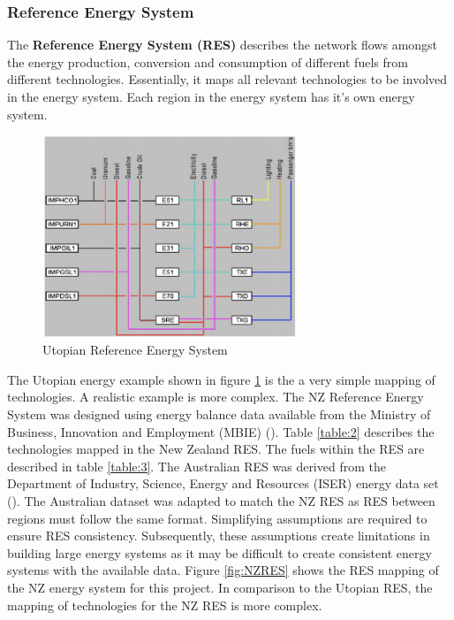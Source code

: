 \documentclass[12pt]{article}
\begin{document}
\subsubsection{Reference Energy System}
The \textbf{Reference Energy System (RES)} describes the network flows amongst the energy production, conversion and consumption of different fuels from different technologies.
Essentially, it maps all relevant technologies to be involved in the energy system. Each region in the energy system has it's own energy system.

\begin{figure}
	\begin{center}
		\includegraphics[width=0.68\textwidth]{URES.png}
	\end{center}
	\caption{Utopian Reference Energy System}
	\label{fig:URES}
\end{figure}
The Utopian energy example shown in figure \ref{fig:URES} is the a very simple mapping of technologies.
A realistic example is more complex. The NZ Reference Energy System was designed using energy balance data available from
the Ministry of Business, Innovation and Employment (MBIE) (\cite{MBIE_ESEM}). 
Table \ref{table:2} describes the technologies mapped in the New Zealand RES.
The fuels within the RES are  described in table \ref{table:3}.
The Australian RES was derived from the Department of Industry, Science, Energy and Resources (ISER) energy data set (\cite{DOEA_ESEM}).
The Australian dataset was adapted to match the NZ RES as RES between regions must follow the same format. 
Simplifying assumptions are required to ensure RES consistency.  
Subsequently, these assumptions create limitations in building large energy systems as it may be difficult to create consistent energy systems with the available data.
Figure \ref{fig:NZRES} shows the RES mapping of the NZ energy system for this project.
In comparison to the Utopian RES, the mapping of technologies for the NZ RES is more complex.
\end{document}
